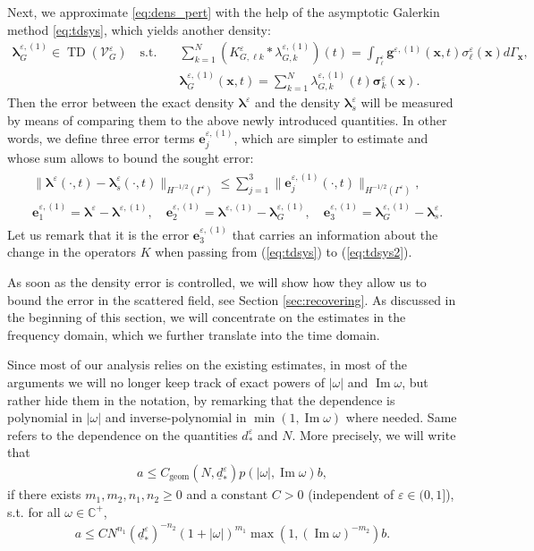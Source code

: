 \documentclass[]{article}
\numberwithin{equation}{section}
\numberwithin{theorem}{section}
\numberwithin{lemma}{section}
\numberwithin{corollary}{section}
\numberwithin{proposition}{section}
\numberwithin{definition}{section}
\newcommand{\re}{\varepsilon}
\renewcommand{\vec}{\boldsymbol}
\renewcommand{\Im}{\operatorname{Im}}
\begin{document}
	Next, we approximate \eqref{eq:dens_pert} with the help of the asymptotic Galerkin method \eqref{eq:tdsys}, which yields another density:
	\begin{align}
		\label{eq:fdsys_corr}
			{\vec{\lambda}}^{\re,(1)}_G\in \operatorname{TD}(\mathcal{V}_{G}^{\re}) \quad \text{s.t.} \quad &\sum\limits_{k=1}^N (K^{\re}_{G, \ell k}*	{\lambda}^{\re,(1)}_{G, k})(t)=\int_{\Gamma^{\re}_{\ell}}{\vec{g}}^{\re,(1)}(\vec{x},t)\sigma^{\re}_{\ell}(\vec{x})d\Gamma_{\vec{x}},\\	
			\nonumber	&{\vec{\lambda}}^{\re,(1)}_G(\vec{x},t)=\sum\limits_{k=1}^N \lambda^{\re,(1)}_{G, k }(t)\vec{\sigma}_k^{\re}(\vec{x}).
	\end{align} 
	Then the error between the exact density $\boldsymbol{\lambda}^{\re}$ and the density $\boldsymbol{\lambda}^{\re}_s$ will be measured by means of comparing them to the above newly introduced quantities. In other words, we define three error terms $\vec{e}_j^{\re,(1)}$, which are simpler to estimate and whose sum allows to bound the sought error:
	\begin{align}
		\label{eq:three_errors}
		\begin{split}
			&\|\vec{\lambda}^{\re}(\cdot,t)-\boldsymbol{\lambda}^{\re}_s(\cdot,t)\|_{H^{-1/2}(\Gamma^{\re})}\leq 	\sum\limits_{j=1}^3\|\vec{e}_j^{\re,(1)}(\cdot,t)\|_{H^{-1/2}(\Gamma^{\re})},\\
			&\vec{e}_1^{\re,(1)}=\boldsymbol{\lambda}^{\re}-\boldsymbol{\lambda}^{\re,(1)},\quad
			\vec{e}_2^{\re,(1)}=\boldsymbol{\lambda}^{\re,(1)}-\boldsymbol{\lambda}^{\re,(1)}_G,\quad
			\vec{e}_3^{\re,(1)}=\boldsymbol{\lambda}^{\re,(1)}_G-\boldsymbol{\lambda}^{\re}_s.
		\end{split}
	\end{align}
	Let us remark that it is the error $\vec{e}_3^{\re,(1)}$ that carries an information about the change in the operators $K$ when passing from (\ref{eq:tdsys}) to (\ref{eq:tdsys2}). 
	
	As soon as the density error is controlled, we will show how they allow us to bound the error in the scattered field, see Section \ref{sec:recovering}. As discussed in the beginning of this section, we will concentrate on the estimates in the frequency domain, which we further translate into the time domain. 
	
	Since most of our analysis relies on the existing estimates, in most of the arguments we will no longer keep track of exact powers of $|\omega|$ and $\Im \omega$, but rather hide them in the notation, by remarking that the dependence is polynomial in $|\omega|$ and inverse-polynomial in $\min(1,\Im \omega)$ where needed. Same refers to the dependence on the quantities $d_*^{\re}$ and $N$.  More precisely, we will write that 
	\begin{align*}%
		a\leq C_{\operatorname{geom}}(N, \underline{d}_*^{\re}) p(|\omega|,\Im \omega)b,
	\end{align*}
	if there exists $m_1,m_2,n_1,n_2\geq 0$ and a constant $C>0$ (independent of $\re\in (0,1]$), s.t. for all $\omega\in \mathbb{C}^+$, 
	\begin{align*}%
		a\leq C N^{n_1}(\underline{d}_*^{\re})^{-n_2} (1+|\omega|)^{m_1}\max(1, (\Im \omega)^{-m_2})b.
	\end{align*}
\end{document}
